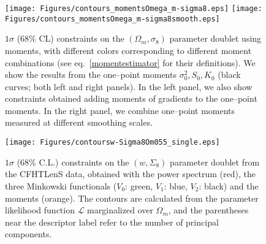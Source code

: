 \documentclass[reprint,aps,prd,superscriptaddress,showkeys,showpacs]{revtex4-1}
\begin{document}
\begin{figure*}
\begin{center}
\texttt{[image: Figures/contours\_momentsOmega\_m-sigma8.eps]}
\texttt{[image: Figures/contours\_momentsOmega\_m-sigma8smooth.eps]}
\end{center}
\caption{$1\sigma$ (68\% CL) constraints on the $(\Omega_m,\sigma_8)$
  parameter doublet using moments, with different colors corresponding
  to different moment combinations (see eq.~\ref{momentestimator} for
  their definitions). We show the results from the one--point moments
  $\sigma_0^2,S_0,K_0$ (black curves; both left and right panels). In
  the left panel, we also show constraints obtained adding moments of
  gradients to the one--point moments. In the right panel, we combine
  one--point moments measured at different smoothing scales. }
\label{contoursMoments}
\end{figure*}

\begin{figure}
\begin{center}
\texttt{[image: Figures/contoursw-Sigma8Om055\_single.eps]}
\end{center}
\caption{$1\sigma$ (68\% C.L.) constraints on the $(w,\Sigma_8)$
  parameter doublet from the CFHTLenS data, obtained with the power
  spectrum (red), the three Minkowski functionals ($V_0$: green,
  $V_1$: blue, $V_2$: black) and the moments (orange).
   The contours are calculated from the parameter likelihood function
   $\mathcal{L}$ marginalized over $\Omega_m$, and the parentheses
   near the descriptor label refer to the number of principal
   components.}
\label{contours3singleRep}
\end{figure}
\end{document}
